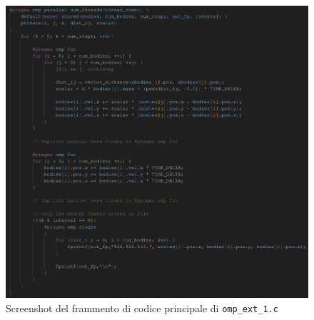 \documentclass[12pt]{report}
\begin{document}
    \begin{figure}[H]
        \centering
        \includegraphics[width=\textwidth]{images/omp_ext_1.png}
        \caption{Screenshot del frammento di codice principale di \texttt{omp\_ext\_1.c}}
        \label{fig:omp_ext_1}
    \end{figure}
\end{document}

